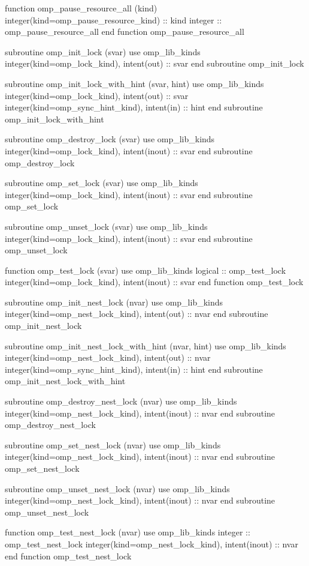 {\begin{ompfFunction}
    function omp_pause_resource_all (kind)
      integer(kind=omp_pause_resource_kind) :: kind
      integer :: omp_pause_resource_all
    end function omp_pause_resource_all

    subroutine omp_init_lock (svar)
      use omp_lib_kinds
      integer(kind=omp_lock_kind), intent(out) :: svar
    end subroutine omp_init_lock

    subroutine omp_init_lock_with_hint (svar, hint)
      use omp_lib_kinds
      integer(kind=omp_lock_kind), intent(out) :: svar
      integer(kind=omp_sync_hint_kind), intent(in) :: hint
    end subroutine omp_init_lock_with_hint

    subroutine omp_destroy_lock (svar)
      use omp_lib_kinds
      integer(kind=omp_lock_kind), intent(inout) :: svar
    end subroutine omp_destroy_lock

    subroutine omp_set_lock (svar)
      use omp_lib_kinds
      integer(kind=omp_lock_kind), intent(inout) :: svar
    end subroutine omp_set_lock

    subroutine omp_unset_lock (svar)
      use omp_lib_kinds
      integer(kind=omp_lock_kind), intent(inout) :: svar
    end subroutine omp_unset_lock

    function omp_test_lock (svar)
      use omp_lib_kinds
      logical :: omp_test_lock
      integer(kind=omp_lock_kind), intent(inout) :: svar
    end function omp_test_lock

    subroutine omp_init_nest_lock (nvar)
      use omp_lib_kinds
      integer(kind=omp_nest_lock_kind), intent(out) :: nvar
    end subroutine omp_init_nest_lock

    subroutine omp_init_nest_lock_with_hint (nvar, hint)
      use omp_lib_kinds
      integer(kind=omp_nest_lock_kind), intent(out) :: nvar
      integer(kind=omp_sync_hint_kind), intent(in) :: hint
    end subroutine omp_init_nest_lock_with_hint

    subroutine omp_destroy_nest_lock (nvar)
      use omp_lib_kinds
      integer(kind=omp_nest_lock_kind), intent(inout) :: nvar
    end subroutine omp_destroy_nest_lock

    subroutine omp_set_nest_lock (nvar)
      use omp_lib_kinds
      integer(kind=omp_nest_lock_kind), intent(inout) :: nvar
    end subroutine omp_set_nest_lock

    subroutine omp_unset_nest_lock (nvar)
      use omp_lib_kinds
      integer(kind=omp_nest_lock_kind), intent(inout) :: nvar
    end subroutine omp_unset_nest_lock

    function omp_test_nest_lock (nvar)
      use omp_lib_kinds
      integer :: omp_test_nest_lock
      integer(kind=omp_nest_lock_kind), intent(inout) :: nvar
    end function omp_test_nest_lock


\end{ompfFunction}}
